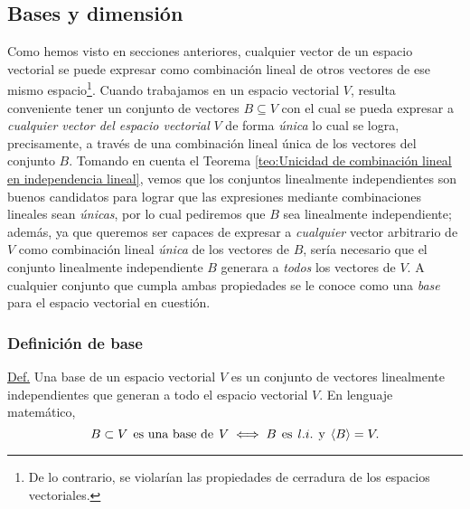 \documentclass[notasLineal]{subfiles}
\begin{document}
\newpage
\subsection*{Bases y dimensión} \label{Ssec:Bases y dimensión}

Como hemos visto en secciones anteriores, cualquier vector de un espacio vectorial se puede expresar como combinación lineal de otros vectores de ese mismo espacio\footnote{De lo contrario, se violarían las propiedades de cerradura de los espacios vectoriales.}. Cuando trabajamos en un espacio vectorial $V$, resulta conveniente tener un conjunto de vectores $B\subseteq V$ con el cual se pueda expresar a \emph{cualquier vector del espacio vectorial} $V$ de forma \emph{única} \textemdash lo cual se logra, precisamente, a través de una combinación lineal única de los vectores del conjunto $B$. Tomando en cuenta el Teorema \ref{teo:Unicidad de combinación lineal en independencia lineal}, vemos que los conjuntos linealmente independientes son buenos candidatos para lograr que las expresiones mediante combinaciones lineales sean \emph{únicas}, por lo cual pediremos que $B$ sea linealmente independiente; además, ya que queremos ser capaces de expresar a \emph{cualquier} vector arbitrario de $V$ como combinación lineal \emph{única} de los vectores de $B$, sería necesario que el conjunto linealmente independiente $B$ generara a \emph{todos} los vectores de $V$. A cualquier conjunto que cumpla ambas propiedades se le conoce como una \emph{base} para el espacio vectorial en cuestión.

\subsubsection*{Definición de base} \label{Sssec: Definición de base}

\begin{tcolorbox}

    \underline{Def.} Una base de un espacio vectorial $V$ es un conjunto de vectores linealmente independientes que generan a todo el espacio vectorial $V$. En lenguaje matemático, $$B\subset V \hspace{1.5mm}\text{es una base de}\hspace{1.5mm} V \iff B\hspace{1.5mm}\text{es}\hspace{1.5mm} l.i.  \hspace{1.5mm}\text{y}\hspace{1.5mm} \langle B \rangle=V.$$

\end{tcolorbox}
\end{document}
